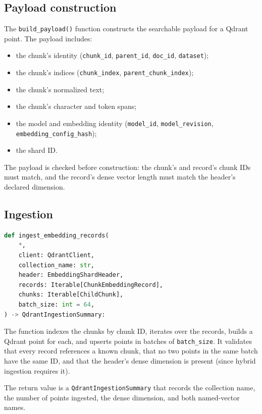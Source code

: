 \documentclass[11pt,a4paper]{article}
\begin{document}
\subsection{Payload construction}
The \texttt{build\_payload()} function constructs the searchable
payload for a Qdrant point. The payload includes:

\begin{itemize}[leftmargin=1.5em,itemsep=0.15em]
  \item the chunk's identity (\texttt{chunk\_id}, \texttt{parent\_id},
    \texttt{doc\_id}, \texttt{dataset});
  \item the chunk's indices (\texttt{chunk\_index},
    \texttt{parent\_chunk\_index});
  \item the chunk's normalized text;
  \item the chunk's character and token spans;
  \item the model and embedding identity (\texttt{model\_id},
    \texttt{model\_revision}, \texttt{embedding\_config\_hash});
  \item the shard ID.
\end{itemize}

The payload is checked before construction: the chunk's and record's
chunk IDs must match, and the record's dense vector length must match
the header's declared dimension.

\subsection{Ingestion}
\begin{lstlisting}[language=python]
def ingest_embedding_records(
    *,
    client: QdrantClient,
    collection_name: str,
    header: EmbeddingShardHeader,
    records: Iterable[ChunkEmbeddingRecord],
    chunks: Iterable[ChildChunk],
    batch_size: int = 64,
) -> QdrantIngestionSummary:
\end{lstlisting}

The function indexes the chunks by chunk ID, iterates over the
records, builds a Qdrant point for each, and upserts points in
batches of \texttt{batch\_size}. It validates that every record
references a known chunk, that no two points in the same batch have
the same ID, and that the header's dense dimension is present (since
hybrid ingestion requires it).

The return value is a \texttt{QdrantIngestionSummary} that records
the collection name, the number of points ingested, the dense
dimension, and both named-vector names.
\end{document}
